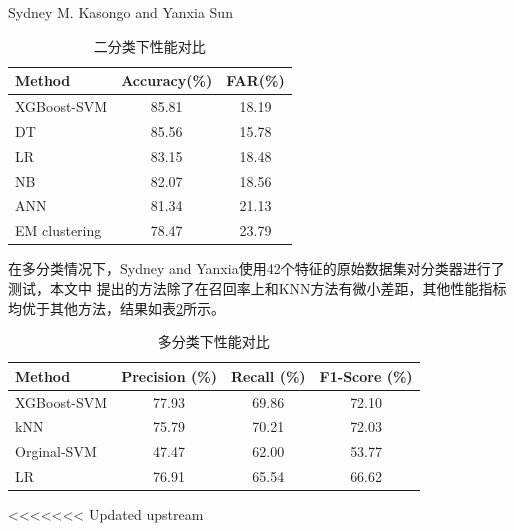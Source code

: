 \documentclass{article}
\begin{document}
Sydney M. Kasongo  and Yanxia Sun
\begin{table}[H]
  \caption{二分类下性能对比}
  \label{table:compare1}
  \centering
  \begin{tabular}{lcc}
    \toprule
      Method        & Accuracy(\%)  & FAR(\%) \\ \midrule
    XGBoost-SVM     & 85.81    & 18.19  \\    
    DT     & 85.56   & 15.78  \\    
    LR     & 83.15   & 18.48  \\    
    NB     & 82.07   & 18.56  \\   
    ANN     & 81.34   & 21.13  \\      
    EM clustering    & 78.47   & 23.79   \\\bottomrule 
  \end{tabular}
\end{table}
在多分类情况下，Sydney and Yanxia使用42个特征的原始数据集对分类器进行了测试\cite{ref2}，本文中
提出的方法除了在召回率上和KNN方法有微小差距，其他性能指标均优于其他方法，结果如表\ref{table:compare2}所示。
\begin{table}[H]
  \caption{多分类下性能对比}
  \label{table:compare2}
  \centering
  \begin{tabular}{lccc}
    \toprule
      Method & Precision (\%) & Recall (\%) & F1-Score (\%) \\ \midrule
      XGBoost-SVM & 77.93 & 69.86 & 72.10 \\
      kNN & 75.79 & 70.21 & 72.03 \\
      Orginal-SVM & 47.47 & 62.00 & 53.77 \\
      LR & 76.91 & 65.54 & 66.62 \\ \bottomrule 
  \end{tabular}
\end{table}

<<<<<<< Updated upstream
\end{document}
